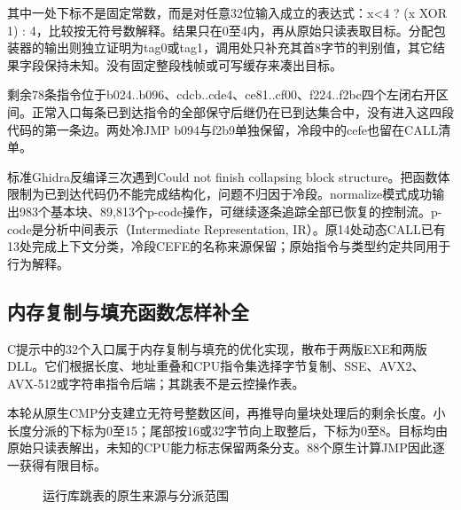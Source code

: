 \documentclass[UTF8,a4paper,zihao=5,fontset=windows]{ctexart}
\newcommand{\code}[1]{{\ttfamily\small #1}}
\begin{document}
其中一处下标不是固定常数，而是对任意32位输入成立的表达式：\code{x<4 ? (x XOR 1) : 4}，比较按无符号数解释。结果只在0至4内，再从原始只读表取目标。分配包装器的输出则独立证明为tag0或tag1，调用处只补充其首8字节的判别值，其它结果字段保持未知。没有固定整段栈帧或可写缓存来凑出目标。

剩余78条指令位于\code{b024..b096}、\code{cdcb..cde4}、\code{ce81..cf00}、\code{f224..f2bc}四个左闭右开区间。正常入口每条已到达指令的全部保守后继仍在已到达集合中，没有进入这四段代码的第一条边。两处冷JMP \code{b094}与\code{f2b9}单独保留，冷段中的\code{cefe}也留在CALL清单。

标准Ghidra反编译三次遇到\code{Could not finish collapsing block structure}。把函数体限制为已到达代码仍不能完成结构化，问题不归因于冷段。normalize模式成功输出983个基本块、89,813个p-code操作，可继续逐条追踪全部已恢复的控制流。p-code是分析中间表示（Intermediate Representation, IR）。原14处动态CALL已有13处完成上下文分类，冷段CEFE的名称来源保留；原始指令与类型约定共同用于行为解释。

\subsection{内存复制与填充函数怎样补全}
C提示中的32个入口属于内存复制与填充的优化实现，散布于两版EXE和两版DLL。它们根据长度、地址重叠和CPU指令集选择字节复制、SSE、AVX2、AVX-512或字符串指令后端；其跳表不是云控操作表。

本轮从原生CMP分支建立无符号整数区间，再推导向量块处理后的剩余长度。小长度分派的下标为0至15；尾部按16或32字节向上取整后，下标为0至8。目标均由原始只读表解出，未知的CPU能力标志保留两条分支。88个原生计算JMP因此逐一获得有限目标。

\begin{figure}[H]\centering
{}
\caption{运行库跳表的原生来源与分派范围}
\end{figure}
\end{document}

